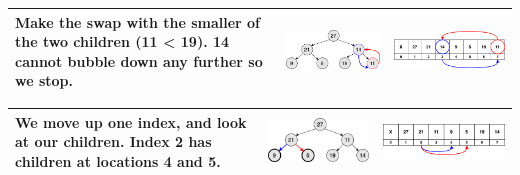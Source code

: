 \begin{center}
	\begin{table}
		\begin{tabular}{| p{}|M{0.30\textwidth}|M{0.35\textwidth}|}
			\hline
			\scriptsize{Make the swap with the smaller of the two children (11 < 19). 14 cannot bubble down any further so we stop.}
			  &   
			\includegraphics[scale=.30]{images/heapify_tree_04.png}
			  &   
			\includegraphics[scale=.30]{images/heapify_04.png}\\
			\hline
		\end{tabular}
	\end{table}
\end{center}


\begin{center}
	\begin{table}
		\begin{tabular}{| p{}|M{0.30\textwidth}|M{0.35\textwidth}|}
			\hline
			\scriptsize{We move up one index, and look at our children. Index 2 has children at locations 4 and 5.}
			  &   
			\includegraphics[scale=.30]{images/heapify_tree_05.png}
			  &   
			\includegraphics[scale=.30]{images/heapify_05.png}\\
			\hline
		\end{tabular}
	\end{table}
\end{center}


